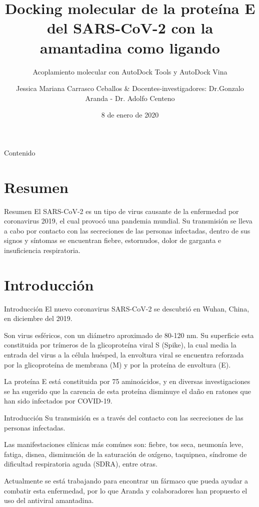\documentclass[11pt]{beamer}
\author[Jessica]{Jessica Mariana Carrasco Ceballos\inst{1} \& Docentes-investigadores: Dr.Gonzalo Aranda - Dr. Adolfo Centeno  \inst{1}}
\title[Docking molecular]{Docking molecular de la proteína E del SARS-CoV-2 con la amantadina como ligando}
\date{8 de enero de 2020}
\subtitle{Acoplamiento molecular con AutoDock Tools y AutoDock Vina}
\institute[UV]{
	\inst{1}
		Universidad Veracruzana. \\Instituto de Investigaciones Cerebrales.\\
		\vspace{2mm}
	
}
\begin{document}
	
	\begin{frame}
		\maketitle
	\end{frame}

	\begin{frame}{Contenido}
		\tableofcontents
	\end{frame}

	\section{Resumen}
		\begin{frame}{Resumen}
			\justifying El SARS-CoV-2 es un tipo de virus causante de la enfermedad por coronavirus 2019, el cual provocó una pandemia mundial. Su transmisión se lleva a cabo por contacto con las secreciones de las personas infectadas, dentro de sus signos y síntomas se encuentran fiebre, estornudos, dolor de garganta e insuficiencia respiratoria.
		\end{frame}
	
	\section{Introducción}
		\begin{frame}{Introducción}
			\justifying El nuevo coronavirus SARS-CoV-2 se descubrió en Wuhan, China, en diciembre del 2019. 
			
			Son virus esféricos, con un diámetro aproximado de 80-120 nm. Su superficie esta constituida por trímeros de la glicoproteína viral S (Spike), la cual media la entrada del virus a la célula huésped, la envoltura viral se encuentra reforzada por la glicoproteína de membrana (M) y por la proteína de envoltura (E).
			
			La proteína E está constituida por 75 aminoácidos, y en diversas investigaciones se ha sugerido que la carencia de esta proteína disminuye el daño en ratones que han sido infectados por COVID-19.
			\end{frame}
			
			\begin{frame}{Introducción}
			Su transmisión es a través del contacto con las secreciones de las personas infectadas.
			
			Las manifestaciones clínicas más comúnes son: fiebre, tos seca, neumonía leve, fatiga, disnea, disminución de la saturación de oxígeno, taquipnea, síndrome de dificultad respiratoria aguda (SDRA), entre otras.
			
			Actualmente se está trabajando para encontrar un fármaco que pueda ayudar a combatir esta enfermedad, por lo que Aranda y colaboradores han propuesto el uso del antiviral amantadina.
		\end{frame}
		
\end{document}
